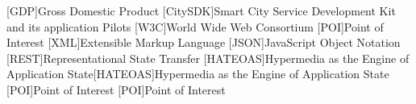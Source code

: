 [GDP]{Gross Domestic Product}
[CitySDK]{Smart City Service Development Kit and its application Pilots}
[W3C]{World Wide Web Consortium}
[POI]{Point of Interest}
[XML]{Extensible Markup Language}
[JSON]{JavaScript Object Notation}
[REST]{Representational State Transfer}
[HATEOAS]{Hypermedia as the Engine of Application State}[HATEOAS]{Hypermedia as the Engine of Application State}
[POI]{Point of Interest}
[POI]{Point of Interest}
